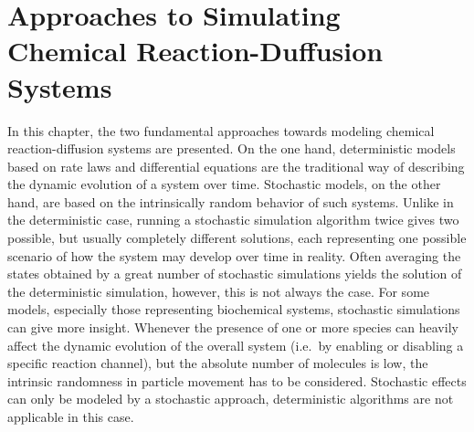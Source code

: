 \chapter{Approaches to Simulating Chemical Reaction-Duffusion Systems}

In this chapter, the two fundamental approaches towards modeling chemical reaction-diffusion systems are presented. On the one hand, deterministic models based on rate laws and differential equations are the traditional way of describing the dynamic evolution of a system over time. Stochastic models, on the other hand, are based on the intrinsically random behavior of such systems. Unlike in the deterministic case, running a stochastic simulation algorithm twice gives two possible, but usually completely different solutions, each representing one possible scenario of how the system may develop over time in reality. Often averaging the states obtained by a great number of stochastic simulations yields the solution of the deterministic simulation, however, this is not always the case. For some models, especially those representing biochemical systems, stochastic simulations can give more insight. Whenever the presence of one or more species can heavily affect the dynamic evolution of the overall system (i.e.\ by enabling or disabling a specific reaction channel), but the absolute number of molecules is low, the intrinsic randomness in particle movement has to be considered. Stochastic effects can only be modeled by a stochastic approach, deterministic algorithms are not applicable in this case. 
%


